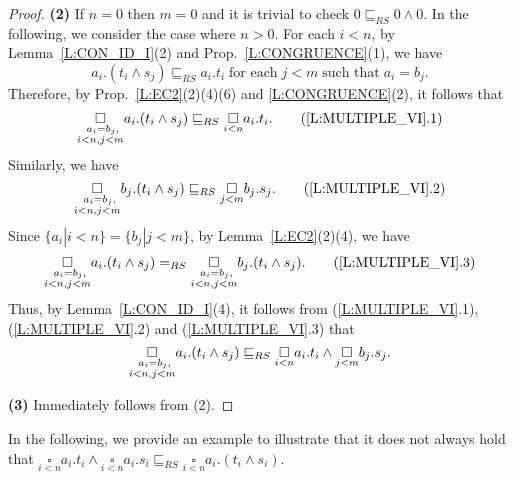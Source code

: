 \documentclass{elsarticle}
\theoremstyle{plain}
\theoremstyle{definition}
\begin{document}
\begin{proof}
\noindent \textbf{(2)}
If $n=0$ then $m=0$ and it is trivial to check $ 0 \sqsubseteq_{RS} 0 \wedge 0$.
In the following, we consider the case where $n>0$.
For each $i<n$, by Lemma~\ref{L:CON_ID_I}(2) and Prop.~\ref{L:CONGRUENCE}(1), we have
\[a_i.(t_i \wedge s_j) \sqsubseteq_{RS} a_i.t_i\;\text{for each}\; j<m\;\text{such that}\;a_i=b_j.\]
Therefore, by Prop.~\ref{L:EC2}(2)(4)(6) and \ref{L:CONGRUENCE}(2), it follows that
\[\underset{\begin{subarray}
                   \;\;\;\;a_i= b_j,\\
                   i< n,j<m
                \end{subarray}} {\square}a_i.(t_i \wedge s_j) \sqsubseteq_{RS} \underset{i< n}{\square}a_i.t_i. \tag{\ref{L:MULTIPLE_VI}.1}\]
Similarly, we have
\[\underset{\begin{subarray}
                   \;\;\;\;a_i= b_j,\\
                   i< n,j<m
                \end{subarray}} {\square}b_j.(t_i \wedge s_j) \sqsubseteq_{RS} \underset{j< m}{\square}b_j.s_j. \tag{\ref{L:MULTIPLE_VI}.2}\]
Since $\{a_i|i<n\}=\{b_j|j<m\}$, by Lemma~\ref{L:EC2}(2)(4), we have
\[\underset{\begin{subarray}
                   \;\;\;\;a_i= b_j,\\
                   i< n,j<m
                \end{subarray}} {\square}a_i.(t_i \wedge s_j) =_{RS}
                \underset{\begin{subarray}
                   \;\;\;\;a_i= b_j,\\
                   i< n,j<m
                \end{subarray}} {\square}b_j.(t_i \wedge s_j). \tag{\ref{L:MULTIPLE_VI}.3}\]
Thus, by Lemma~\ref{L:CON_ID_I}(4), it follows from (\ref{L:MULTIPLE_VI}.1), (\ref{L:MULTIPLE_VI}.2) and (\ref{L:MULTIPLE_VI}.3) that
 \[\underset{\begin{subarray}
                   \;\;\;\;a_i= b_j,\\
                   i< n,j<m
                \end{subarray}} {\square}a_i.(t_i \wedge s_j) \sqsubseteq_{RS} \underset{i< n}{\square}a_i.t_i \wedge \underset{j< m}{\square}b_j.s_j. \]

\noindent \textbf{(3)} Immediately follows from (2).
\end{proof}

In the following, we provide an example to illustrate that it does not always hold that $\underset{i< n}{\square}a_i.t_i\wedge \underset{i< n}{\square}a_i.s_i \sqsubseteq_{RS} \underset{i< n} {\square}a_i.(t_i \wedge s_i)$.
\end{document}
